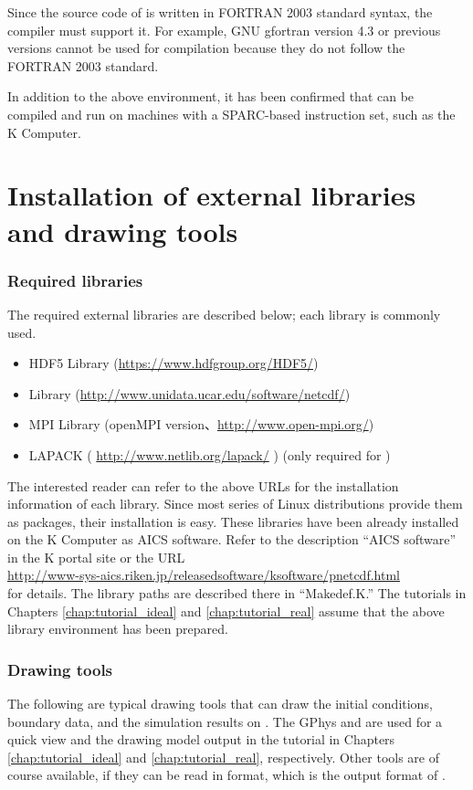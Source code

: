 Since the source code of \scalelib is  written in FORTRAN 2003 standard syntax, the compiler must support it. For example, GNU gfortran version 4.3 or previous versions cannot be used for \scalelib compilation because they do not follow the FORTRAN 2003 standard.

In addition to the above environment, it has been confirmed that \scalelib can be compiled and run on  machines with a SPARC-based instruction set, such as the K Computer.



\section{Installation of external libraries and drawing tools} \label{sec:inst_env}
\subsubsection{Required libraries}
The required external libraries are described below; each library is commonly used.
\begin{itemize}
\item HDF5 Library (\url{https://www.hdfgroup.org/HDF5/})
\item {\netcdf} Library (\url{http://www.unidata.ucar.edu/software/netcdf/})
\item MPI Library (openMPI version、\url{http://www.open-mpi.org/})
\item LAPACK ( \url{http://www.netlib.org/lapack/} ) (only required for \scalegm)
\end{itemize}
The interested reader can refer to the above URLs for the installation information of each library.  Since most series of Linux distributions provide them as packages, their installation is easy. These libraries have been already installed on the K Computer as AICS software. Refer to the description ``AICS software'' in the K portal site or the URL\\ \url{http://www-sys-aics.riken.jp/releasedsoftware/ksoftware/pnetcdf.html}\\ for details. The library paths are described there in ``Makedef.K.'' The tutorials in Chapters \ref{chap:tutorial_ideal} and \ref{chap:tutorial_real} assume that the above library environment has been prepared.


\subsubsection{Drawing tools}
The following are typical drawing tools that can draw
the initial conditions, boundary data, and the simulation results on \scalelib.
The GPhys and \grads are used for a quick view
and the drawing model output in the tutorial in Chapters \ref{chap:tutorial_ideal} and \ref{chap:tutorial_real}, respectively.
Other tools are of course available,
if they can be read in \netcdf format, which is the output format of \scalelib.

